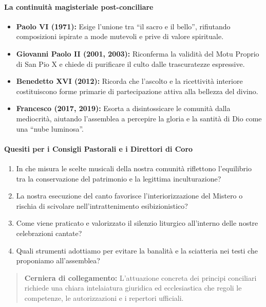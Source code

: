 \documentclass[12pt,a4paper]{article}
\begin{document}
	\paragraph{La continuità magisteriale post-conciliare}\label{la-continuita-magisteriale-post-conciliare}
	
	\begin{itemize}[leftmargin=*]
		\item \textbf{Paolo VI (1971):} Esige l'unione tra ``il sacro e il bello'', rifiutando composizioni ispirate a mode mutevoli e prive di valore spirituale.
		\item \textbf{Giovanni Paolo II (2001, 2003):} Riconferma la validità del Motu Proprio di San Pio X e chiede di purificare il culto dalle trascuratezze espressive.
		\item \textbf{Benedetto XVI (2012):} Ricorda che l'ascolto e la ricettività interiore costituiscono forme primarie di partecipazione attiva alla bellezza del divino.
		\item \textbf{Francesco (2017, 2019):} Esorta a disintossicare le comunità dalla mediocrità, aiutando l'assemblea a percepire la gloria e la santità di Dio come una ``nube luminosa''.
	\end{itemize}
	
	\paragraph{Quesiti per i Consigli Pastorali e i Direttori di Coro}\label{quesiti-per-i-consigli-pastorali-e-i-direttori-di-coro}
	
	\begin{enumerate}[label=\arabic*.,leftmargin=*]
		\item In che misura le scelte musicali della nostra comunità riflettono l'equilibrio tra la conservazione del patrimonio e la legittima inculturazione?
		\item La nostra esecuzione del canto favorisce l'interiorizzazione del Mistero o rischia di scivolare nell'intrattenimento esibizionistico?
		\item Come viene praticato e valorizzato il silenzio liturgico all'interno delle nostre celebrazioni cantate?
		\item Quali strumenti adottiamo per evitare la banalità e la sciatteria nei testi che proponiamo all'assemblea?
	\end{enumerate}
	
	\begin{quote}
		\textbf{Cerniera di collegamento:} L'attuazione concreta dei principi conciliari richiede una chiara intelaiatura giuridica ed ecclesiastica che regoli le competenze, le autorizzazioni e i repertori ufficiali.
	\end{quote}
	
\end{document}

